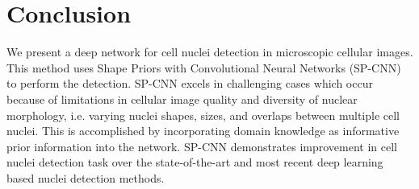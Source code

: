 \documentclass{article}
\begin{document}
\section{Conclusion}
We present a deep network for cell nuclei detection in microscopic cellular images. This method uses Shape Priors with Convolutional Neural Networks (SP-CNN) to perform the detection. SP-CNN excels in challenging cases which occur because of limitations in cellular image quality and diversity of nuclear morphology, i.e. varying nuclei shapes, sizes, and overlaps between multiple cell nuclei. This is accomplished by incorporating domain knowledge as informative prior information into the network. SP-CNN demonstrates improvement in cell nuclei detection task over the state-of-the-art and most recent deep learning based nuclei detection methods.

\begin{spacing}{0.9}


\end{spacing}
\end{document}
